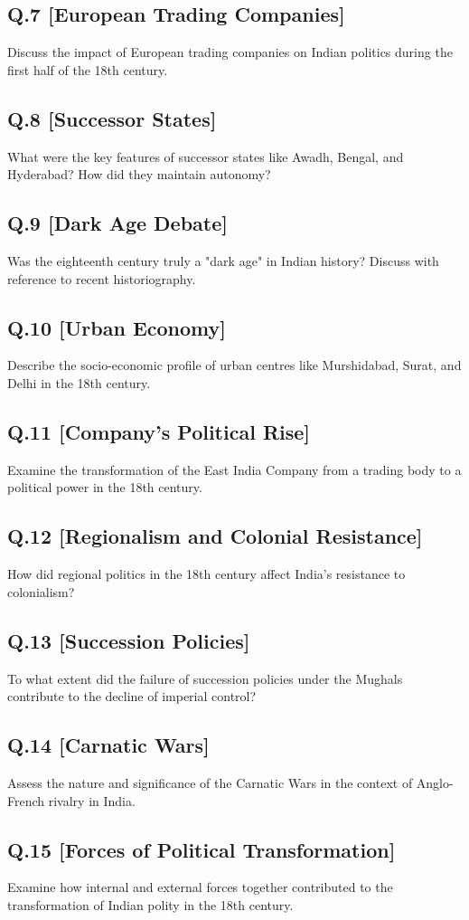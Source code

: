 \subsection*{Q.7 [European Trading Companies]}
Discuss the impact of European trading companies on Indian politics during the first half of the 18th century.

\subsection*{Q.8 [Successor States]}
What were the key features of successor states like Awadh, Bengal, and Hyderabad? How did they maintain autonomy?

\subsection*{Q.9 [Dark Age Debate]}
Was the eighteenth century truly a "dark age" in Indian history? Discuss with reference to recent historiography.

\subsection*{Q.10 [Urban Economy]}
Describe the socio-economic profile of urban centres like Murshidabad, Surat, and Delhi in the 18th century.

\subsection*{Q.11 [Company's Political Rise]}
Examine the transformation of the East India Company from a trading body to a political power in the 18th century.

\subsection*{Q.12 [Regionalism and Colonial Resistance]}
How did regional politics in the 18th century affect India's resistance to colonialism?

\subsection*{Q.13 [Succession Policies]}
To what extent did the failure of succession policies under the Mughals contribute to the decline of imperial control?

\subsection*{Q.14 [Carnatic Wars]}
Assess the nature and significance of the Carnatic Wars in the context of Anglo-French rivalry in India.

\subsection*{Q.15 [Forces of Political Transformation]}
Examine how internal and external forces together contributed to the transformation of Indian polity in the 18th century.

